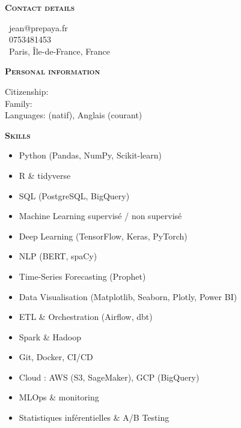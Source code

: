 \documentclass[11pt,a4paper]{article}
\newcommand{\headleft}[1]{\vspace*{3ex}\textsc{\textbf{#1}}\par%
    \vspace*{-1.5ex}\hrulefill\par\vspace*{0.7ex}}
\begin{document}
\begin{minipage}[t]{0.33\textwidth}
{\begin{minipage}[t][293mm][t]{0.82\textwidth}
\headleft{Contact details}\small
\MVAt\ {\small jean@prepaya.fr} \\[0.4ex]
\Mobilefone\ 0753481453 \\[0.5ex]
\Letter\ Paris, Île-de-France, France
\normalsize

\headleft{Personal information}
Citizenship:  \\[0.5ex]
Family:  \\[0.5ex]
Languages:  (natif), Anglais (courant)

\headleft{Skills}
\begin{itemize}

  \item Python (Pandas, NumPy, Scikit-learn)

  \item R & tidyverse

  \item SQL (PostgreSQL, BigQuery)

  \item Machine Learning supervisé / non supervisé

  \item Deep Learning (TensorFlow, Keras, PyTorch)

  \item NLP (BERT, spaCy)

  \item Time-Series Forecasting (Prophet)

  \item Data Visualisation (Matplotlib, Seaborn, Plotly, Power BI)

  \item ETL & Orchestration (Airflow, dbt)

  \item Spark & Hadoop

  \item Git, Docker, CI/CD

  \item Cloud : AWS (S3, SageMaker), GCP (BigQuery)

  \item MLOps & monitoring

  \item Statistiques inférentielles & A/B Testing

\end{itemize}

\end{minipage}\textwidth
}
\end{minipage}
\end{document}
